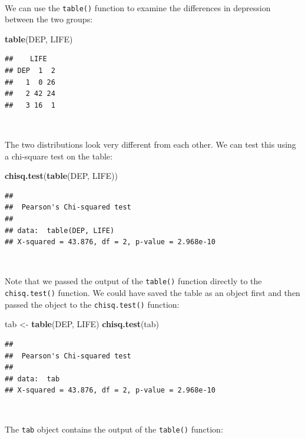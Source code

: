 \documentclass[12pt,a4paper]{book}
\newenvironment{Shaded}{\begin{snugshade}}{\end{snugshade}}
\newcommand{\KeywordTok}[1]{\textcolor[rgb]{0.13,0.29,0.53}{\textbf{#1}}}
\newcommand{\StringTok}[1]{\textcolor[rgb]{0.31,0.60,0.02}{#1}}
\newcommand{\NormalTok}[1]{#1}
\theoremstyle{definition}
\theoremstyle{definition}
\theoremstyle{definition}
\theoremstyle{remark}
\begin{document}
~

We can use the \texttt{table()} function to examine the differences in
depression between the two groups:

\begin{Shaded}
\begin{Highlighting}[]
\KeywordTok{table}\NormalTok{(DEP, LIFE)}
\end{Highlighting}
\end{Shaded}

\begin{verbatim}
##    LIFE
## DEP  1  2
##   1  0 26
##   2 42 24
##   3 16  1
\end{verbatim}

~

The two distributions look very different from each other. We can test
this using a chi-square test on the table:

\begin{Shaded}
\begin{Highlighting}[]
\KeywordTok{chisq.test}\NormalTok{(}\KeywordTok{table}\NormalTok{(DEP, LIFE))}
\end{Highlighting}
\end{Shaded}

\begin{verbatim}
## 
##  Pearson's Chi-squared test
## 
## data:  table(DEP, LIFE)
## X-squared = 43.876, df = 2, p-value = 2.968e-10
\end{verbatim}

~

Note that we passed the output of the \texttt{table()} function directly
to the \texttt{chisq.test()} function. We could have saved the table as
an object first and then passed the object to the \texttt{chisq.test()}
function:

\begin{Shaded}
\begin{Highlighting}[]
\NormalTok{tab <-}\StringTok{ }\KeywordTok{table}\NormalTok{(DEP, LIFE)}
\KeywordTok{chisq.test}\NormalTok{(tab)}
\end{Highlighting}
\end{Shaded}

\begin{verbatim}
## 
##  Pearson's Chi-squared test
## 
## data:  tab
## X-squared = 43.876, df = 2, p-value = 2.968e-10
\end{verbatim}

~

The \texttt{tab} object contains the output of the \texttt{table()}
function:
\end{document}
